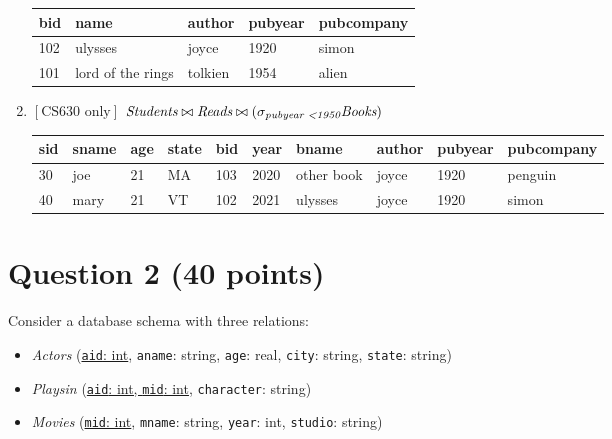 \documentclass[letterpaper, 11pt]{article}
\begin{document}
\begin{enumerate}[label={\alph*}),leftmargin=*]
\begin{table}[H]
\begin{tabular}{|l|l|l|l|l|}
        \hline
            \cellcolor[HTML]{b4c6e7} bid & \cellcolor[HTML]{b4c6e7} name & \cellcolor[HTML]{b4c6e7} author & \cellcolor[HTML]{b4c6e7} pubyear & \cellcolor[HTML]{b4c6e7} pubcompany \\
            \hline
            102 & ulysses & joyce & 1920 & simon \\
            \hline
            101 & lord of the rings & tolkien & 1954 & alien \\
            \hline
        \end{tabular}
    \end{table}
    \item $\left[\text{CS630 only}\right]$ $\textit{Students} \bowtie \textit{Reads} \bowtie (\sigma_{\textit{pubyear \textless 1950}}\textit{Books})$
    \begin{table}[H]
        \centering
        \begin{tabular}{|l|l|l|l|l|l|l|l|l|l|}
            \hline
            \cellcolor[HTML]{b4c6e7} sid & \cellcolor[HTML]{b4c6e7} sname & \cellcolor[HTML]{b4c6e7} age & \cellcolor[HTML]{b4c6e7} state & \cellcolor[HTML]{b4c6e7} bid & \cellcolor[HTML]{b4c6e7} year & \cellcolor[HTML]{b4c6e7} bname & \cellcolor[HTML]{b4c6e7} author & \cellcolor[HTML]{b4c6e7} pubyear & \cellcolor[HTML]{b4c6e7} pubcompany \\
            \hline
            30 & joe & 21 & MA & 103 & 2020 & other book & joyce & 1920 & penguin \\
            \hline
            40 & mary & 21 & VT & 102 & 2021 & ulysses & joyce & 1920 & simon \\
            \hline
        \end{tabular}
    \end{table}
\end{enumerate}

\section*{Question 2 (40 points)}

Consider a database schema with three relations:
\begin{itemize}
    \item \textit{Actors} (\ul{\texttt{aid}: int}, \texttt{aname}: string, \texttt{age}: real, \texttt{city}: string, \texttt{state}: string)
    \item \textit{Playsin} (\ul{\texttt{aid}: int, \texttt{mid}: int}, \texttt{character}: string)
    \item \textit{Movies} (\ul{\texttt{mid}: int}, \texttt{mname}: string, \texttt{year}: int, \texttt{studio}: string)
\end{itemize}
\end{document}
